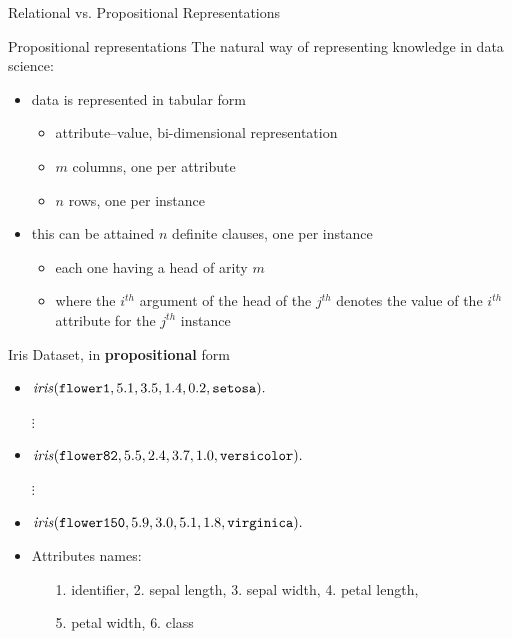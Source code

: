 \documentclass[presentation]{beamer}\mode<presentation>{\usetheme{AMSBolognaFC}}
\begin{document}
\begin{frame}[allowframebreaks]{Relational vs. Propositional Representations}

    \begin{block}{Propositional representations}
        The natural way of representing knowledge in \alert{data science}:
        \begin{itemize}
            \item data is represented in \alert{tabular form}
            \begin{itemize}
                \item \alert{attribute--value}, bi-dimensional representation
                \item $m$ columns, one per attribute
                \item $n$ rows, one per instance
            \end{itemize}

            \item this can be attained $n$ definite clauses, one per instance
            \begin{itemize}
                \item each one having a head of arity $m$
                \item where the $i^{th}$ argument of the head of the $j^{th}$ denotes the value of the $i^{th}$ attribute for the $j^{th}$ instance
            \end{itemize}
        \end{itemize}
    \end{block}

    \begin{exampleblock}{Iris Dataset, in \textbf{propositional} form}
        \begin{itemize}
            \item $\text{\textit{iris}}(\mathtt{flower1}, 5.1, 3.5, 1.4, 0.2, \mathtt{setosa}) \mathtt{.}$
            \item[$\vdots$]
            \item $\text{\textit{iris}}(\mathtt{flower82}, 5.5, 2.4, 3.7, 1.0, \mathtt{versicolor}) \mathtt{.}$
            \item[$\vdots$]
            \item $\text{\textit{iris}}(\mathtt{flower150}, 5.9, 3.0, 5.1, 1.8,  \mathtt{virginica}) \mathtt{.}$
        \end{itemize}
    \end{exampleblock}
    \begin{itemize}
        \item Attributes names:
        \begin{itemize}
            \item[1.] identifier, \alert{2.} sepal length, \alert{3.} sepal width, \alert{4.} petal length,
            \item[5.] petal width, \alert{6.} class
        \end{itemize}
    \end{itemize}


\end{frame}
\end{document}
